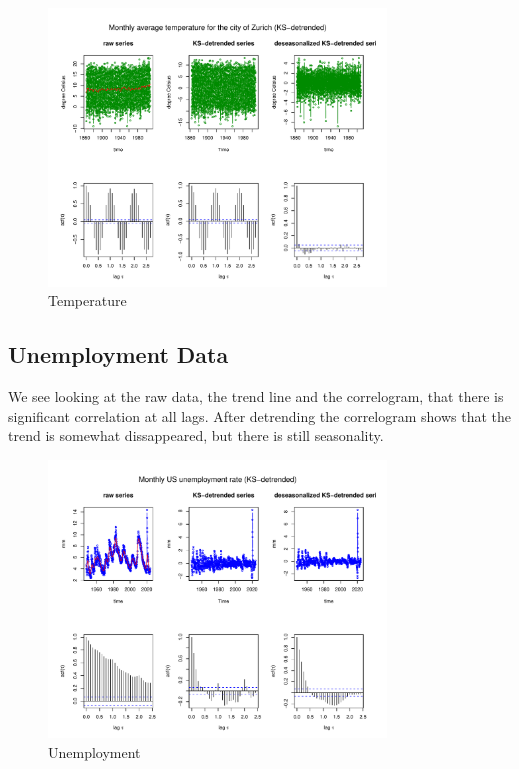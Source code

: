 \begin{figure}[H]
\centering
\includegraphics[width=0.8\textwidth]{plots/ZHP4.pdf}
\caption{Temperature}
\end{figure}

\subsection{Unemployment Data}

We see looking at the raw data, the trend line and the correlogram, that there is significant correlation at all lags. After detrending the correlogram shows that the trend is somewhat dissappeared, but there is still seasonality.

\begin{figure}[H]
\centering
\includegraphics[width=0.8\textwidth]{plots/UEMP.pdf}
\caption{Unemployment}
\end{figure}


